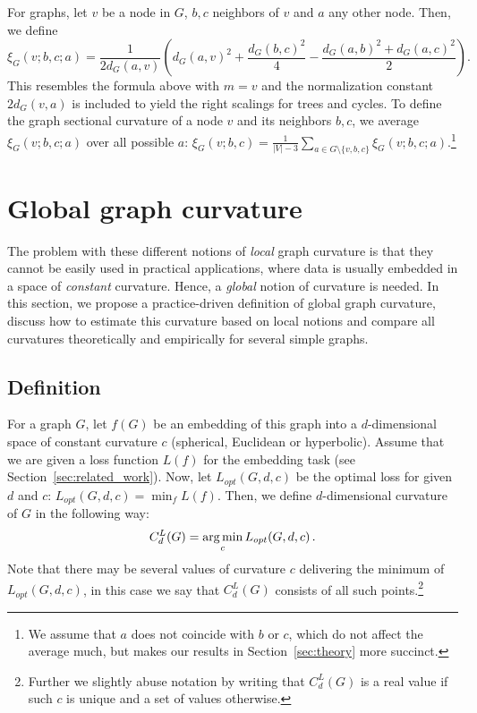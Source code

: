 \documentclass{article} %
\begin{document}
For graphs, let $v$ be a node in $G$, $b,c$ neighbors of $v$ and $a$ any other node. Then, we define
\begin{equation}
\xi_G(v;b,c;a) = \frac{1}{2 d_G(a,v)} \left( d_G(a,v)^2 + \frac{d_G(b,c)^2}{4} - \frac{d_G(a,b)^2 + d_G(a,c)^2}{2} \right).
\end{equation}
This resembles
the formula above
with $m = v$ and the normalization constant $2d_G(v,a)$ is included to yield the right scalings for trees and cycles.
To define the graph sectional curvature of a node $v$ and its neighbors $b,c$, we average $\xi_G(v;b,c;a)$ over all possible $a$: 
$\xi_G(v; b,c) = \frac{1}{|V|-3} \sum_{a \in G\setminus \{v,b,c\}} \xi_G(v;b,c;a)$.\footnote{We assume that $a$ does not coincide with $b$ or $c$, which do not affect the average much, but makes our results in Section~\ref{sec:theory} more succinct.}

\section{Global graph curvature}\label{sec:global}

The problem with these different notions of \textit{local} graph curvature is that they cannot be easily used in practical applications, where data is usually embedded in a space of \textit{constant} curvature.
Hence, a \textit{global} notion of curvature is needed. 
In this section, we propose a practice-driven definition of global graph curvature, discuss how to estimate this curvature based on local notions and compare all curvatures theoretically and empirically for several simple graphs. 

\subsection{Definition}\label{sec:global_curvature_definition}

For a graph $G$, let $f(G)$ be an embedding of this graph into a $d$-dimensional space of constant curvature $c$ (spherical, Euclidean or hyperbolic). 
Assume that we are given a loss function $L(f)$ for the embedding task (see Section~\ref{sec:related_work}).
Now, let $L_{opt}(G,d,c)$ be the optimal loss for given $d$ and $c$:
$L_{opt}(G,d,c) = \min_{f} L(f).$
Then, we define $d$-dimensional curvature of $G$ in the following way:
\begin{equation}\label{eq:global_curvature}
C_{d}^{L}(G) = \operatorname*{arg\,min}_c L_{opt}(G,d,c)\,.
\end{equation}
Note that there may be several values of curvature $c$ delivering the minimum of $L_{opt}(G,d,c)$, in this case we say that  $C_{d}^{L}(G)$ consists of all such points.\footnote{Further we slightly abuse notation by writing that $C_{d}^{L}(G)$ is a real value if such $c$ is unique and a set of values otherwise.}
\end{document}
